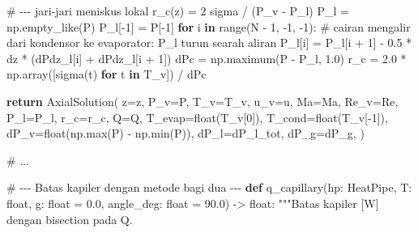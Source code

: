 \documentclass[
  indonesian,
  12pt,
  a4paper,
]{report}
\newenvironment{Shaded}{\begin{snugshade}}{\end{snugshade}}
\newcommand{\BuiltInTok}[1]{\textcolor[rgb]{0.00,0.23,0.31}{#1}}
\newcommand{\CommentTok}[1]{\textcolor[rgb]{0.37,0.37,0.37}{#1}}
\newcommand{\ControlFlowTok}[1]{\textcolor[rgb]{0.00,0.23,0.31}{\textbf{#1}}}
\newcommand{\DecValTok}[1]{\textcolor[rgb]{0.68,0.00,0.00}{#1}}
\newcommand{\FloatTok}[1]{\textcolor[rgb]{0.68,0.00,0.00}{#1}}
\newcommand{\KeywordTok}[1]{\textcolor[rgb]{0.00,0.23,0.31}{\textbf{#1}}}
\newcommand{\NormalTok}[1]{\textcolor[rgb]{0.00,0.23,0.31}{#1}}
\newcommand{\OperatorTok}[1]{\textcolor[rgb]{0.37,0.37,0.37}{#1}}
\begin{document}
\begin{Shaded}
\begin{Highlighting}[]
    \CommentTok{\# {-}{-}{-} jari{-}jari meniskus lokal r\_c(z) = 2 sigma / (P\_v {-} P\_l)}
\NormalTok{    P\_l }\OperatorTok{=}\NormalTok{ np.empty\_like(P)}
\NormalTok{    P\_l[}\OperatorTok{{-}}\DecValTok{1}\NormalTok{] }\OperatorTok{=}\NormalTok{ P[}\OperatorTok{{-}}\DecValTok{1}\NormalTok{]}
    \ControlFlowTok{for}\NormalTok{ i }\KeywordTok{in} \BuiltInTok{range}\NormalTok{(N }\OperatorTok{{-}} \DecValTok{1}\NormalTok{, }\OperatorTok{{-}}\DecValTok{1}\NormalTok{, }\OperatorTok{{-}}\DecValTok{1}\NormalTok{):}
        \CommentTok{\# cairan mengalir dari kondensor ke evaporator: P\_l turun searah aliran}
\NormalTok{        P\_l[i] }\OperatorTok{=}\NormalTok{ P\_l[i }\OperatorTok{+} \DecValTok{1}\NormalTok{] }\OperatorTok{{-}} \FloatTok{0.5} \OperatorTok{*}\NormalTok{ dz }\OperatorTok{*}\NormalTok{ (dPdz\_l[i] }\OperatorTok{+}\NormalTok{ dPdz\_l[i }\OperatorTok{+} \DecValTok{1}\NormalTok{])}
\NormalTok{    dPc }\OperatorTok{=}\NormalTok{ np.maximum(P }\OperatorTok{{-}}\NormalTok{ P\_l, }\FloatTok{1.0}\NormalTok{)}
\NormalTok{    r\_c }\OperatorTok{=} \FloatTok{2.0} \OperatorTok{*}\NormalTok{ np.array([sigma(t) }\ControlFlowTok{for}\NormalTok{ t }\KeywordTok{in}\NormalTok{ T\_v]) }\OperatorTok{/}\NormalTok{ dPc}

    \ControlFlowTok{return}\NormalTok{ AxialSolution(}
\NormalTok{        z}\OperatorTok{=}\NormalTok{z, P\_v}\OperatorTok{=}\NormalTok{P, T\_v}\OperatorTok{=}\NormalTok{T\_v, u\_v}\OperatorTok{=}\NormalTok{u, Ma}\OperatorTok{=}\NormalTok{Ma, Re\_v}\OperatorTok{=}\NormalTok{Re, P\_l}\OperatorTok{=}\NormalTok{P\_l, r\_c}\OperatorTok{=}\NormalTok{r\_c,}
\NormalTok{        Q}\OperatorTok{=}\NormalTok{Q, T\_evap}\OperatorTok{=}\BuiltInTok{float}\NormalTok{(T\_v[}\DecValTok{0}\NormalTok{]), T\_cond}\OperatorTok{=}\BuiltInTok{float}\NormalTok{(T\_v[}\OperatorTok{{-}}\DecValTok{1}\NormalTok{]),}
\NormalTok{        dP\_v}\OperatorTok{=}\BuiltInTok{float}\NormalTok{(np.}\BuiltInTok{max}\NormalTok{(P) }\OperatorTok{{-}}\NormalTok{ np.}\BuiltInTok{min}\NormalTok{(P)), dP\_l}\OperatorTok{=}\NormalTok{dP\_l\_tot, dP\_g}\OperatorTok{=}\NormalTok{dP\_g,}
\NormalTok{    )}

\CommentTok{\# ...}

\CommentTok{\# {-}{-}{-} Batas kapiler dengan metode bagi dua {-}{-}{-}}
\KeywordTok{def}\NormalTok{ q\_capillary(hp: HeatPipe, T: }\BuiltInTok{float}\NormalTok{, g: }\BuiltInTok{float} \OperatorTok{=} \FloatTok{0.0}\NormalTok{,}
\NormalTok{                angle\_deg: }\BuiltInTok{float} \OperatorTok{=} \FloatTok{90.0}\NormalTok{) }\OperatorTok{{-}\textgreater{}} \BuiltInTok{float}\NormalTok{:}
    \CommentTok{"""Batas kapiler [W] dengan bisection pada Q.}


\end{Highlighting}
\end{Shaded}
\end{document}
